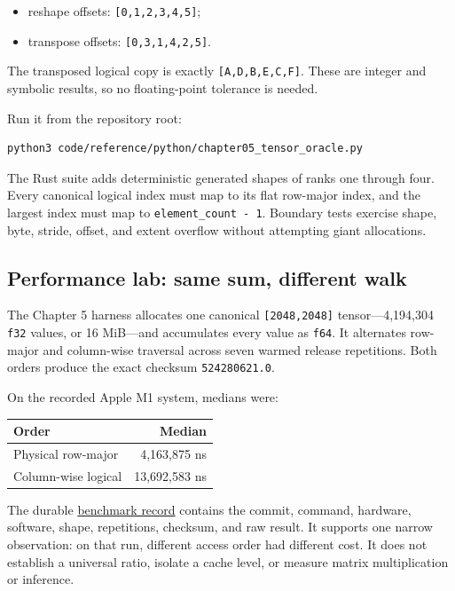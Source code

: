 \documentclass[
  10pt,
]{article}
\newcounter{none} %
\providecommand{\tightlist}{%
  \setlength{\itemsep}{0pt}\setlength{\parskip}{0pt}}
\begin{document}
\begin{itemize}
\tightlist
\item
  reshape offsets: \texttt{{[}0,1,2,3,4,5{]}};
\item
  transpose offsets: \texttt{{[}0,3,1,4,2,5{]}}.
\end{itemize}

The transposed logical copy is exactly \texttt{{[}A,D,B,E,C,F{]}}. These
are integer and symbolic results, so no floating-point tolerance is
needed.

Run it from the repository root:

\begin{verbatim}
python3 code/reference/python/chapter05_tensor_oracle.py
\end{verbatim}

The Rust suite adds deterministic generated shapes of ranks one through
four. Every canonical logical index must map to its flat row-major
index, and the largest index must map to \texttt{element\_count\ -\ 1}.
Boundary tests exercise shape, byte, stride, offset, and extent overflow
without attempting giant allocations.

\subsection{Performance lab: same sum, different
walk}\label{performance-lab-same-sum-different-walk}

The Chapter 5 harness allocates one canonical \texttt{{[}2048,2048{]}}
tensor---4,194,304 \texttt{f32} values, or 16 MiB---and accumulates
every value as \texttt{f64}. It alternates row-major and column-wise
traversal across seven warmed release repetitions. Both orders produce
the exact checksum \texttt{524280621.0}.

On the recorded Apple M1 system, medians were:

{\def\LTcaptype{none} %
\begin{longtable}[]{@{}lr@{}}
\toprule\noalign{}
Order & Median \\
\midrule\noalign{}
\endhead
\bottomrule\noalign{}
\endlastfoot
Physical row-major & 4,163,875 ns \\
Column-wise logical & 13,692,583 ns \\
\end{longtable}
}

The durable
\href{https://github.com/hermonai/inside-the-llm-engine/blob/astra-visual-rewrite/research/benchmarks/chapter-05-traversal-order.md}{benchmark
record} contains the commit, command, hardware, software, shape,
repetitions, checksum, and raw result. It supports one narrow
observation: on that run, different access order had different cost. It
does not establish a universal ratio, isolate a cache level, or measure
matrix multiplication or inference.
\end{document}
